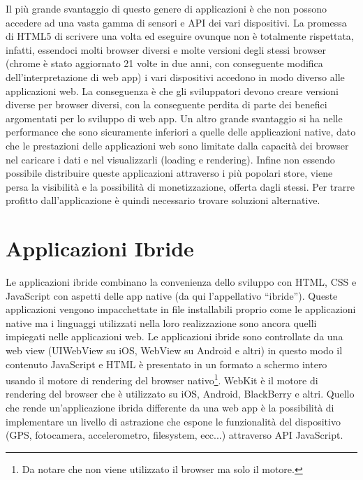 		Il più grande svantaggio di questo genere di applicazioni è che non 
		possono accedere ad una vasta gamma di sensori e API dei vari 
		dispositivi. La promessa di HTML5 di scrivere una volta ed eseguire 
		ovunque non è totalmente rispettata, infatti, essendoci molti browser 
		diversi e molte versioni degli stessi browser (chrome è stato aggiornato 
		21 volte in due anni, con conseguente modifica dell'interpretazione di 
		web app\citep{White:Native-vs-Html}) i vari dispositivi accedono in modo 
		diverso alle applicazioni web. La conseguenza è che gli sviluppatori 
		devono creare versioni diverse per browser diversi, con la conseguente 
		perdita di parte dei benefici argomentati per lo sviluppo di web app. Un 
		altro grande svantaggio si ha nelle performance che sono sicuramente 
		inferiori a quelle delle applicazioni native, dato che le prestazioni 
		delle applicazioni web sono limitate dalla capacità dei browser nel 
		caricare i dati e nel visualizzarli (loading e rendering). Infine non 
		essendo possibile distribuire queste applicazioni attraverso i più 
		popolari store, viene persa la visibilità e la possibilità di 
		monetizzazione, offerta dagli stessi. Per trarre profitto 
		dall'applicazione è quindi necessario trovare soluzioni alternative.
		
	\section{Applicazioni Ibride}
		Le applicazioni ibride combinano la convenienza dello sviluppo con HTML, 
		CSS e JavaScript con aspetti delle app native (da qui l'appellativo 
		``ibride''). Queste applicazioni vengono impacchettate in file 
		installabili proprio come le applicazioni native ma i linguaggi 
		utilizzati nella loro realizzazione sono ancora quelli impiegati nelle 
		applicazioni web. Le applicazioni ibride sono controllate da una web 
		view (UIWebView su iOS, WebView su Android e altri) in questo modo il 
		contenuto JavaScript e HTML è  presentato in un formato a schermo 
		intero usando il motore di rendering del browser nativo\footnote{Da 
		notare che non viene utilizzato il browser ma solo il motore.}. WebKit è 
		il motore di rendering del browser che è utilizzato su iOS, Android, 
		BlackBerry e altri. Quello che rende un'applicazione ibrida differente 
		da una web app è la possibilità di implementare un livello di astrazione 
		che espone le funzionalità del dispositivo (GPS, fotocamera, 
		accelerometro, filesystem, ecc...) attraverso API JavaScript.
		
